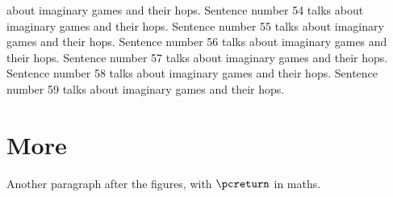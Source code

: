 \documentclass[twocolumn]{article}
\begin{document}
about imaginary games and their hops. Sentence number 54 talks about imaginary games and their hops. Sentence number 55 talks about imaginary games and their hops. Sentence number 56 talks about imaginary games and their hops. Sentence number 57 talks about imaginary games and their hops. Sentence number 58 talks about imaginary games and their hops. Sentence number 59 talks about imaginary games and their hops.

\section{More}
Another paragraph after the figures, with $\pcreturn$ in maths.
\end{document}
